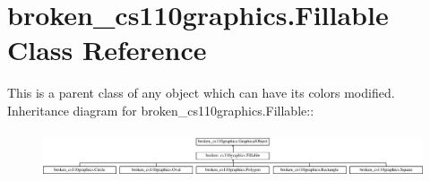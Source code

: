 \hypertarget{classbroken__cs110graphics_1_1Fillable}{
\section{broken\_\-cs110graphics.Fillable Class Reference}
\label{classbroken__cs110graphics_1_1Fillable}
}


This is a parent class of any object which can have its colors modified.  
Inheritance diagram for broken\_\-cs110graphics.Fillable::\begin{figure}[H]
\begin{center}
\leavevmode
\includegraphics[height=1.37143cm]{classbroken__cs110graphics_1_1Fillable}
\end{center}
\end{figure}
